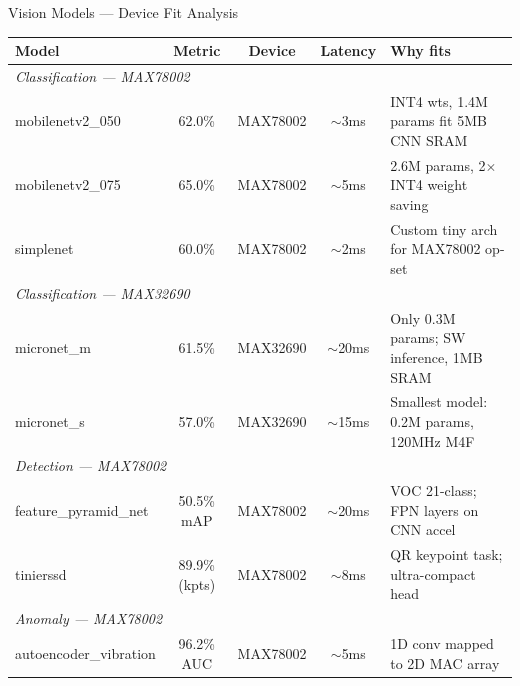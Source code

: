 \documentclass[aspectratio=169]{beamer}
\begin{document}
\begin{frame}{Vision Models --- Device Fit Analysis}
\small
\begin{tabular}{lcccl}
\toprule
\textbf{Model} & \textbf{Metric} & \textbf{Device} & \textbf{Latency} & \textbf{Why fits}\\
\midrule
\multicolumn{5}{l}{\textit{Classification --- MAX78002}}\\
mobilenetv2\_050 & 62.0\% & MAX78002 & $\sim$3ms & INT4 wts, 1.4M params fit 5MB CNN SRAM\\
mobilenetv2\_075 & 65.0\% & MAX78002 & $\sim$5ms & 2.6M params, 2$\times$ INT4 weight saving\\
simplenet & 60.0\% & MAX78002 & $\sim$2ms & Custom tiny arch for MAX78002 op-set\\
\midrule
\multicolumn{5}{l}{\textit{Classification --- MAX32690}}\\
micronet\_m & 61.5\% & MAX32690 & $\sim$20ms & Only 0.3M params; SW inference, 1MB SRAM\\
micronet\_s & 57.0\% & MAX32690 & $\sim$15ms & Smallest model: 0.2M params, 120MHz M4F\\
\midrule
\multicolumn{5}{l}{\textit{Detection --- MAX78002}}\\
feature\_pyramid\_net & 50.5\% mAP & MAX78002 & $\sim$20ms & VOC 21-class; FPN layers on CNN accel\\
tinierssd & 89.9\% (kpts) & MAX78002 & $\sim$8ms & QR keypoint task; ultra-compact head\\
\midrule
\multicolumn{5}{l}{\textit{Anomaly --- MAX78002}}\\
autoencoder\_vibration & 96.2\% AUC & MAX78002 & $\sim$5ms & 1D conv mapped to 2D MAC array\\
\bottomrule
\end{tabular}
\end{frame}
\end{document}
